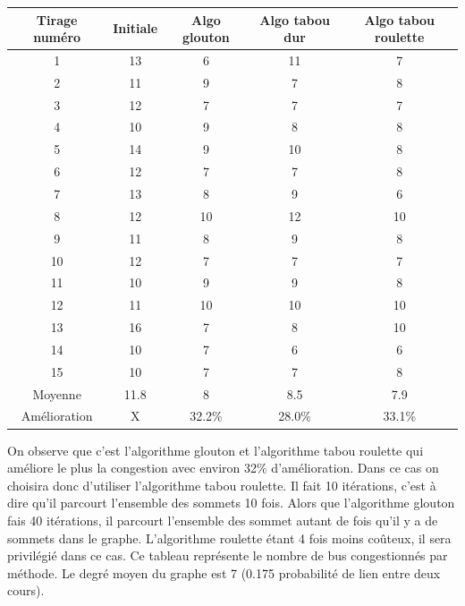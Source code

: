 \documentclass[a4paper,11pt]{article}
\begin{document}
	\begin{tabular}{|c|c|c|c|c|}
  		\hline
  		Tirage numéro & Initiale & Algo glouton & Algo tabou dur & Algo tabou roulette\\
  		\hline
  		1 & 13 & 6 & 11 & 7\\
  		\hline
  		2 & 11 & 9 & 7 & 8\\
  		\hline
  		3 & 12 & 7 & 7 & 7\\
  		\hline
  		4 & 10 & 9 & 8 & 8\\
  		\hline
  		5 & 14 & 9 & 10 & 8\\
  		\hline
  		6 & 12 & 7 & 7 & 8\\
  		\hline
  		7 & 13 & 8 & 9 & 6\\
  		\hline
  		8 & 12 & 10 & 12 & 10\\
  		\hline
  		9 & 11 & 8 & 9 & 8\\
  		\hline
  		10 & 12 & 7 & 7 & 7\\
  		\hline
  		11 & 10 & 9 & 9 & 8\\
  		\hline
  		12 & 11 & 10 & 10 & 10\\
  		\hline
  		13 & 16 & 7 & 8 & 10\\
  		\hline
  		14 & 10 & 7 & 6 & 6\\
  		\hline
  		15 & 10 & 7 & 7 & 8\\
  		\hline
  		Moyenne & 11.8 & 8 & 8.5 & 7.9\\
  		\hline
  		Amélioration & X & 32.2\% & 28.0\% & 33.1\%\\
  		\hline
	\end{tabular}
	On observe que c'est l'algorithme glouton et l'algorithme tabou roulette qui améliore le plus la congestion avec environ 32\% d'amélioration. Dans ce cas on choisira donc d'utiliser l'algorithme tabou roulette. Il fait 10 itérations, c'est à dire qu'il parcourt l'ensemble des sommets 10 fois. Alors que l'algorithme glouton fais 40 itérations, il parcourt l'ensemble des sommet autant de fois qu'il y a de sommets dans le graphe. L'algorithme roulette étant 4 fois moins coûteux, il sera privilégié dans ce cas.
	\newpage
	Ce tableau représente le nombre de bus congestionnés par méthode. Le degré moyen du graphe est 7 (0.175 probabilité de lien entre deux cours).\\ 
\end{document}
